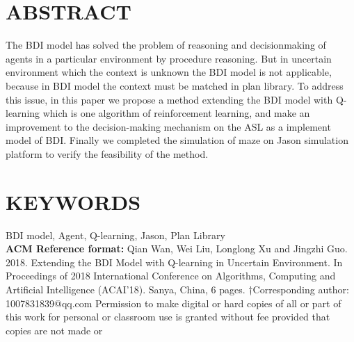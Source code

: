 \documentclass{article}
\begin{document}
\begin{multicols}{2}
\section*{ABSTRACT}
The BDI model has solved the problem of reasoning and decisionmaking of agents in a particular environment by procedure
reasoning. But in uncertain environment which the context is
unknown the BDI model is not applicable, because in BDI model
the context must be matched in plan library. To address this issue,
in this paper we propose a method extending the BDI model with
Q-learning which is one algorithm of reinforcement learning, and
make an improvement to the decision-making mechanism on the
ASL as a implement model of BDI. Finally we completed the
simulation of maze on Jason simulation platform to verify the
feasibility of the method.
\section*{KEYWORDS}
BDI model, Agent, Q-learning, Jason, Plan Library\\
\textbf{ACM Reference format:}
Qian Wan, Wei Liu, Longlong Xu and Jingzhi Guo. 2018. Extending the
BDI Model with Q-learning in Uncertain Environment. In Proceedings of
2018 International Conference on Algorithms, Computing and Artificial
Intelligence (ACAI’18). Sanya, China, 6 pages.
†Corresponding author: 1007831839@qq.com
Permission to make digital or hard copies of all or part of this work for personal or
classroom use is granted without fee provided that copies are not made or



\end{multicols}
\end{document}
